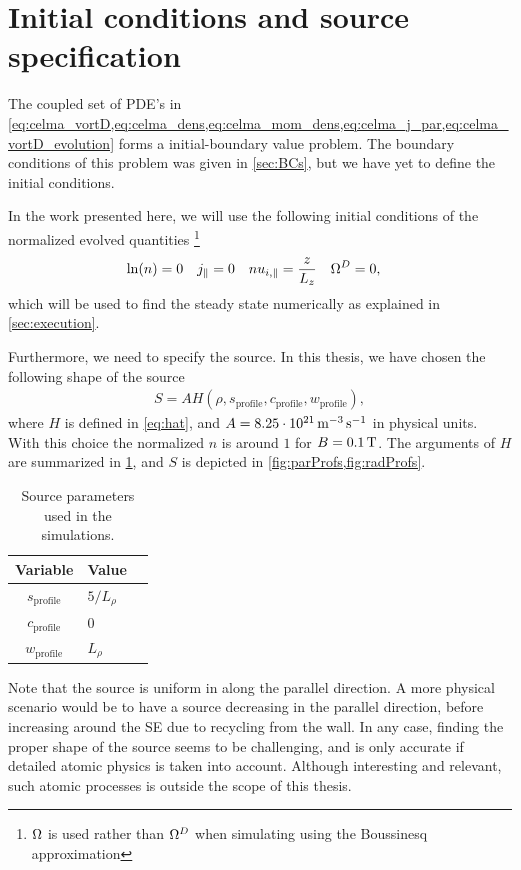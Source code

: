 \section{Initial conditions and source specification}
\label{sec:initRun}
%
The coupled set of PDE's in \cref{eq:celma_vortD,eq:celma_dens,eq:celma_mom_dens,eq:celma_j_par,eq:celma_vortD_evolution} forms a  initial-boundary value problem.
The boundary conditions of this problem was given in \cref{sec:BCs}, but we have yet to define the initial conditions.

In the work presented here, we will use the following initial conditions of the normalized evolved quantities%
%
\footnote{$\Omega$ is used rather than $\Omega^D$ when simulating using the Boussinesq approximation}%
%
\begin{align*}
    &\ln(n)    = 0&
    &j_\|      = 0&
    &nu_{i,\|} = \frac{z}{L_z}&
    &\Omega^D     = 0,&
\end{align*}
%
which will be used to find the steady state numerically as explained in \cref{sec:execution}.

Furthermore, we need to specify the source.
In this thesis, we have chosen the following shape of the source
%
\begin{align*}
    S = AH(\rho,s_{\text{profile}},c_{\text{profile}},w_{\text{profile}}),
\end{align*}
%
where $H$ is defined in \cref{eq:hat}, and $A=8.25\cdot10^{21} \, \text{m}^{-3}\, \text{s}^{-1}$ in physical units.
With this choice the normalized $n$ is around $1$ for $B=0.1\, \text{T}$.
The arguments of $H$ are summarized in \cref{tb:source}, and $S$ is depicted in \cref{fig:parProfs,fig:radProfs}.
%
\begin{table}[!htb]
      \centering
        \caption{Source parameters used in the simulations.}
            \begin{tabular}{c|ll}
            \hline\hline
            Variable & Value \\
            \hline
            $s_{\text{profile}}$ & $5/L_\rho$\\
            $c_{\text{profile}}$ & $0$       \\
            $w_{\text{profile}}$ & $L_\rho$  \\
            \hline\hline
            \end{tabular}
            \label{tb:source}
\end{table}

Note that the source is uniform in along the parallel direction.
A more physical scenario would be to have a source decreasing in the parallel direction, before increasing around the SE due to recycling from the wall.
In any case, finding the proper shape of the source seems to be challenging, and is only accurate if detailed atomic physics is taken into account.
Although interesting and relevant, such atomic processes is outside the scope of this thesis.

